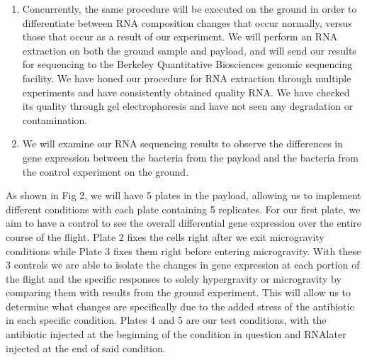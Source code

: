 \documentclass[twocolumn]{article}
\begin{document}
\begin{enumerate}
    \item Concurrently, the same procedure will be executed on the ground in order to differentiate between RNA composition changes that occur normally, versus those that occur as a result of our experiment. We will perform an RNA extraction on both the ground sample and payload, and will send our results for sequencing to the Berkeley Quantitative Biosciences genomic sequencing facility. We have honed our procedure for RNA extraction through multiple experiments and have consistently obtained quality RNA. We have checked its quality through gel electrophoresis and have not seen any degradation or contamination. 
    \item We will examine our RNA sequencing results to observe the differences in gene expression between the bacteria from the payload and the bacteria from the control experiment on the ground. 
\end{enumerate}

As shown in Fig 2, we will have 5 plates in the payload, allowing us to implement different conditions with each plate containing 5 replicates. For our first plate, we aim to have a control to see the overall differential gene expression over the entire course of the flight. Plate 2 fixes the cells right after we exit microgravity conditions while Plate 3 fixes them right before entering microgravity. With these 3 controls we are able to isolate the changes in gene expression at each portion of the flight and the specific responses to solely hypergravity or microgravity by comparing them with results from the ground experiment. This will allow us to determine what changes are specifically due to the added stress of the antibiotic in each specific condition. Plates 4 and 5 are our test conditions, with the antibiotic injected at the beginning of the condition in question and RNAlater injected at the end of said condition.  
\end{document}
